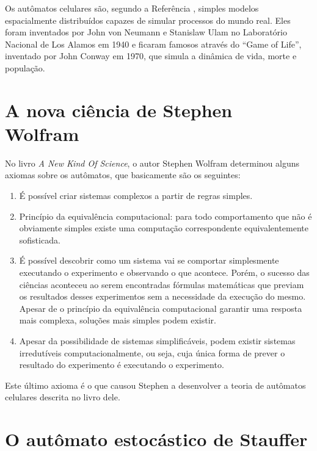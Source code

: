 \documentclass[
	12pt,				%
	openright,			%
	twoside,			%
	a4paper,			%
	english,			%
	french,				%
	spanish,			%
	brazil				%
	]{abntex2}
\begin{document}
Os autômatos celulares são, segundo a Referência , simples modelos espacialmente distribuídos capazes de simular processos do mundo real. Eles foram inventados por John von Neumann e Stanislaw Ulam no Laboratório Nacional de Los Alamos em 1940 e ficaram famosos através do ``Game of Life'', inventado por John Conway em 1970, que simula a dinâmica de vida, morte e população.

\section*{A nova ciência de Stephen Wolfram}

No livro \textit{A New Kind Of Science}, o autor Stephen Wolfram \cite{wolfram} determinou alguns axiomas sobre os autômatos, que basicamente são os seguintes:
\begin{enumerate}
	\item É possível criar sistemas complexos a partir de regras simples.
	\item Princípio da equivalência computacional: para todo comportamento que não é obviamente simples  existe uma computação correspondente equivalentemente sofisticada.
	\item É possível descobrir como um sistema vai se comportar simplesmente executando o experimento e observando o que acontece. Porém, o sucesso das ciências aconteceu ao serem encontradas fórmulas matemáticas que previam os resultados desses experimentos sem a necessidade da execução do mesmo. Apesar de o princípio da equivalência computacional garantir uma resposta mais complexa, soluções mais simples podem existir.
	\item Apesar da possibilidade de sistemas simplificáveis, podem existir sistemas irredutíveis computacionalmente, ou seja, cuja única forma de prever o resultado do experimento é executando o experimento.
\end{enumerate}
Este último axioma é o que causou Stephen a desenvolver a teoria de autômatos celulares descrita no livro dele.

\section*{O autômato estocástico de Stauffer}
\end{document}
